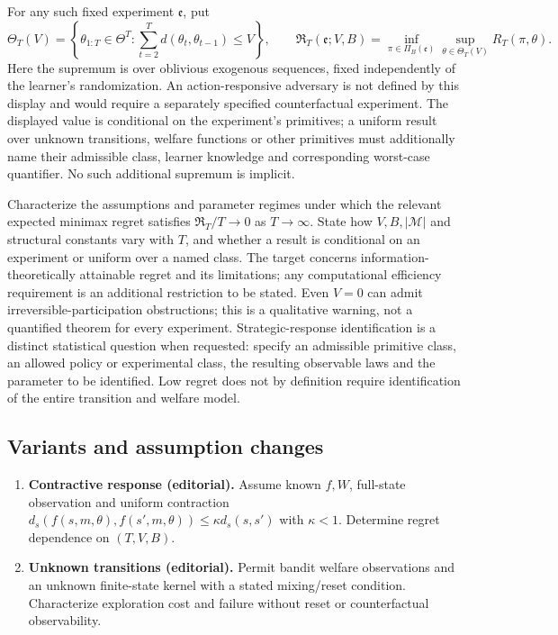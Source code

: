 \documentclass[11pt,a4paper]{article}
\begin{document}
For any such fixed experiment \(\mathfrak e\), put
\[
 \Theta_T(V)=\left\{\theta_{1:T}\in\Theta^T:
 \sum_{t=2}^T d(\theta_t,\theta_{t-1})\le V\right\},\qquad
 \mathfrak R_T(\mathfrak e;V,B)=\inf_{\pi\in\Pi_B(\mathfrak e)}
 \sup_{\theta\in\Theta_T(V)}R_T(\pi,\theta).
\]
Here the supremum is over oblivious exogenous sequences, fixed independently of the learner's randomization. An action-responsive adversary is not defined by this display and would require a separately specified counterfactual experiment. The displayed value is conditional on the experiment's primitives; a uniform result over unknown transitions, welfare functions or other primitives must additionally name their admissible class, learner knowledge and corresponding worst-case quantifier. No such additional supremum is implicit.

Characterize the assumptions and parameter regimes under which the relevant expected minimax regret satisfies \(\mathfrak R_T/T\to0\) as \(T\to\infty\). State how \(V,B,|\mathcal M|\) and structural constants vary with \(T\), and whether a result is conditional on an experiment or uniform over a named class. The target concerns information-theoretically attainable regret and its limitations; any computational efficiency requirement is an additional restriction to be stated. Even \(V=0\) can admit irreversible-participation obstructions; this is a qualitative warning, not a quantified theorem for every experiment. Strategic-response identification is a distinct statistical question when requested: specify an admissible primitive class, an allowed policy or experimental class, the resulting observable laws and the parameter to be identified. Low regret does not by definition require identification of the entire transition and welfare model.
\subsection*{Variants and assumption changes}
\begin{enumerate}
\item \textbf{Contractive response (editorial).} Assume known \(f,W\), full-state observation and uniform contraction \(d_s(f(s,m,\theta),f(s',m,\theta))\le\kappa d_s(s,s')\) with \(\kappa<1\). Determine regret dependence on \((T,V,B)\).
\item \textbf{Unknown transitions (editorial).} Permit bandit welfare observations and an unknown finite-state kernel with a stated mixing/reset condition. Characterize exploration cost and failure without reset or counterfactual observability.
\end{enumerate}
\end{document}
